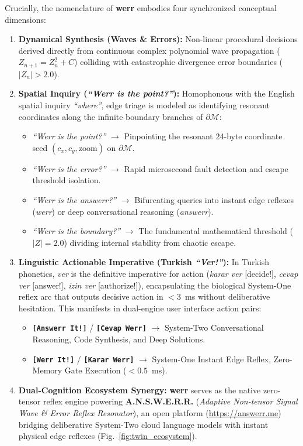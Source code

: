 \documentclass[10pt,journal,compsoc,twocolumn]{article}
\begin{document}
Crucially, the nomenclature of \textbf{werr} embodies four synchronized conceptual dimensions:
\begin{enumerate}
    \item \textbf{Dynamical Synthesis (Waves \& Errors):} Non-linear procedural decisions derived directly from continuous complex polynomial wave propagation ($Z_{n+1} = Z_n^2 + C$) colliding with catastrophic divergence error boundaries ($|Z_n| > 2.0$).
    \item \textbf{Spatial Inquiry (\textit{``Werr is the point?''}):} Homophonous with the English spatial inquiry \textit{``where''}, edge triage is modeled as identifying resonant coordinates along the infinite boundary branches of $\partial \mathcal{M}$:
    \begin{itemize}
        \item \textit{``Werr is the point?''} $\to$ Pinpointing the resonant 24-byte coordinate seed $(c_x, c_y, \text{zoom})$ on $\partial \mathcal{M}$.
        \item \textit{``Werr is the error?''} $\to$ Rapid microsecond fault detection and escape threshold isolation.
        \item \textit{``Werr is the answerr?''} $\to$ Bifurcating queries into instant edge reflexes (\textit{werr}) or deep conversational reasoning (\textit{answerr}).
        \item \textit{``Werr is the boundary?''} $\to$ The fundamental mathematical threshold ($|Z| = 2.0$) dividing internal stability from chaotic escape.
    \end{itemize}
    \item \textbf{Linguistic Actionable Imperative (Turkish \textit{``Ver!''}):} In Turkish phonetics, \textit{ver} is the definitive imperative for action (\textit{karar ver} [decide!], \textit{cevap ver} [answer!], \textit{izin ver} [authorize!]), encapsulating the biological System-One reflex arc that outputs decisive action in $<3$~ms without deliberative hesitation. This manifests in dual-engine user interface action pairs:
    \begin{itemize}
        \item \textbf{\texttt{[Answerr It!]}} / \textbf{\texttt{[Cevap Werr]}} $\to$ System-Two Conversational Reasoning, Code Synthesis, and Deep Solutions.
        \item \textbf{\texttt{[Werr It!]}} / \textbf{\texttt{[Karar Werr]}} $\to$ System-One Instant Edge Reflex, Zero-Memory Gate Execution ($< 0.5$~ms).
    \end{itemize}
    \item \textbf{Dual-Cognition Ecosystem Synergy:} \textbf{werr} serves as the native zero-tensor reflex engine powering \textbf{A.N.S.W.E.R.R.} (\textit{Adaptive Non-tensor Signal Wave \& Error Reflex Resonator}), an open platform (\url{https://answerr.me}) bridging deliberative System-Two cloud language models with instant physical edge reflexes (Fig.~\ref{fig:twin_ecosystem}).
\end{enumerate}
\end{document}
